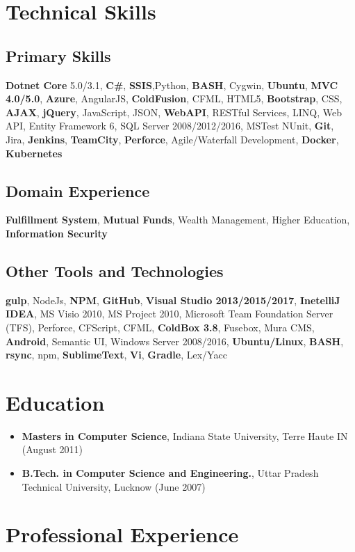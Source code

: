 \documentclass[letterpaper,11pt]{article}
\begin{document}
\section{Technical Skills}
\subsection{Primary Skills}
\textbf{Dotnet Core} 5.0/3.1, \textbf{C\#}, \textbf{SSIS},Python, \textbf{BASH}, Cygwin, \textbf{Ubuntu}, \textbf{MVC 4.0/5.0}, \textbf{Azure}, AngularJS, \textbf{ColdFusion}, CFML, HTML5, \textbf{Bootstrap}, CSS, \textbf{AJAX}, \textbf{jQuery}, JavaScript, JSON, \textbf{WebAPI}, RESTful Services, LINQ, Web API, Entity Framework 6, SQL Server 2008/2012/2016, MSTest NUnit, \textbf{Git}, Jira, \textbf{Jenkins}, \textbf{TeamCity}, \textbf{Perforce}, Agile/Waterfall Development, \textbf{Docker}, \textbf{Kubernetes}

\subsection{Domain Experience}
\textbf{Fulfillment System}, \textbf{Mutual Funds}, Wealth Management, Higher Education, \textbf{Information Security}

\subsection{Other Tools and Technologies}
\textbf{gulp}, NodeJs, \textbf{NPM}, \textbf{GitHub}, \textbf{Visual Studio 2013/2015/2017}, \textbf{InetelliJ IDEA}, MS Visio 2010, MS Project 2010, Microsoft Team Foundation Server (TFS), Perforce, CFScript, CFML, \textbf{ColdBox 3.8}, Fusebox, Mura CMS, \textbf{Android}, Semantic UI, Windows Server 2008/2016, \textbf{Ubuntu/Linux}, \textbf{BASH}, \textbf{rsync}, npm, \textbf{SublimeText}, \textbf{Vi}, \textbf{Gradle}, Lex/Yacc

\section{Education}
\begin{itemize}
    \item \textbf{Masters in Computer Science}, Indiana State University, Terre Haute IN (August 2011)
    \item \textbf{B.Tech. in Computer Science and Engineering.}, Uttar Pradesh Technical University, Lucknow (June 2007)
\end{itemize}

\section{Professional Experience}
\end{document}
